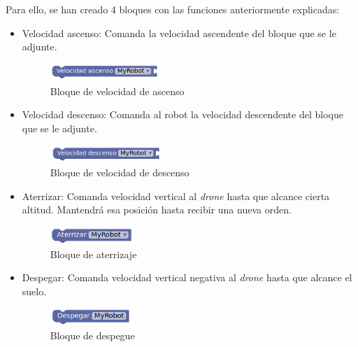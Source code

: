 Para ello, se han creado 4 bloques con las funciones anteriormente explicadas: 
\begin{itemize}
    \item Velocidad ascenso: Comanda la velocidad ascendente del bloque que se le adjunte. 
    \begin{figure}[H]
        \centering
        \includegraphics[width=0.4\textwidth]{img/ascensionBlockly.png}
        \caption{Bloque de velocidad de ascenso} \label{fig:ascension}
    \end{figure}
    
    \item Velocidad descenso: Comanda al robot la velocidad descendente del bloque que se le adjunte. 
    \begin{figure}[H]
        \centering
        \includegraphics[width=0.4\textwidth]{img/descensoBlockly.png}
        \caption{Bloque de velocidad de descenso} \label{fig:descenso}
    \end{figure}
    \item Aterrizar: Comanda velocidad vertical al \textit{drone} hasta que alcance cierta altitud. Mantendrá esa posición hasta recibir una nueva orden.
    \begin{figure}[H]
        \centering
        \includegraphics[width=0.3\textwidth]{img/aterrizarBlockly.png}
        \caption{Bloque de aterrizaje} \label{fig:aterrizaje}
    \end{figure}
    \item Despegar: Comanda velocidad vertical negativa al \textit{drone} hasta que alcance el suelo. 
        \begin{figure}[H]
        \centering
        \includegraphics[width=0.3\textwidth]{img/despegarBlockly.png}
        \caption{Bloque de despegue} \label{fig:despegar}
    \end{figure}
\end{itemize}

